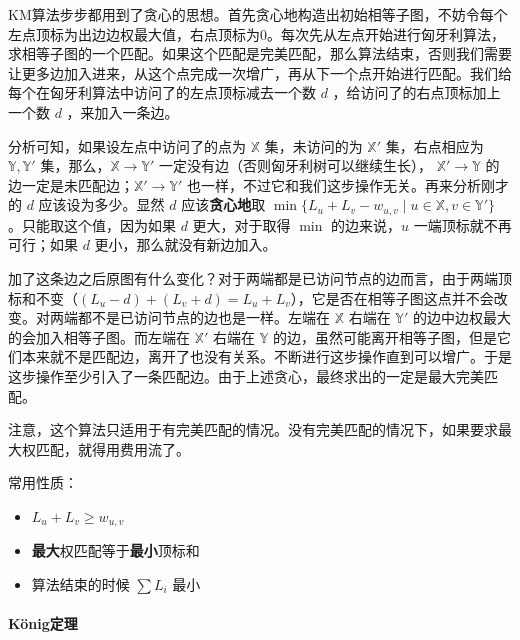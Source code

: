 \documentclass[]{ctexart}
\let\oldparagraph\paragraph
\renewcommand{\paragraph}[1]{\oldparagraph{#1}\mbox{}}
\begin{document}
KM算法步步都用到了贪心的思想。首先贪心地构造出初始相等子图，不妨令每个左点顶标为出边边权最大值，右点顶标为0。每次先从左点开始进行匈牙利算法，求相等子图的一个匹配。如果这个匹配是完美匹配，那么算法结束，否则我们需要让更多边加入进来，从这个点完成一次增广，再从下一个点开始进行匹配。我们给每个在匈牙利算法中访问了的左点顶标减去一个数
\(d\) ，给访问了的右点顶标加上一个数 \(d\) ，来加入一条边。

分析可知，如果设左点中访问了的点为 \(\mathbb{X}\) 集，未访问的为
\(\mathbb{X'}\) 集，右点相应为 \(\mathbb{Y, Y'}\)
集，那么，\(\mathbb{X} \rightarrow \mathbb{Y'}\)
一定没有边（否则匈牙利树可以继续生长），
\(\mathbb{X'} \rightarrow \mathbb{Y}\)
的边一定是未匹配边；\(\mathbb{X'} \rightarrow \mathbb{Y'}\)
也一样，不过它和我们这步操作无关。再来分析刚才的 \(d\)
应该设为多少。显然 \(d\) 应该\textbf{贪心地}取
\( \min\{L_u + L_v - w_{u, v} \mid u \in \mathbb{X}, v \in \mathbb{Y'}\} \)
。只能取这个值，因为如果 \(d\) 更大，对于取得 \(\min\) 的边来说，\(u\)
一端顶标就不再可行；如果 \(d\) 更小，那么就没有新边加入。

加了这条边之后原图有什么变化？对于两端都是已访问节点的边而言，由于两端顶标和不变（\((L_u - d) + (L_v + d) = L_u + L_v\)），它是否在相等子图这点并不会改变。对两端都不是已访问节点的边也是一样。左端在
\(\mathbb{X}\) 右端在 \(\mathbb{Y'}\)
的边中边权最大的会加入相等子图。而左端在 \(\mathbb{X'}\) 右端在
\( \mathbb{Y}\)
的边，虽然可能离开相等子图，但是它们本来就不是匹配边，离开了也没有关系。不断进行这步操作直到可以增广。于是这步操作至少引入了一条匹配边。由于上述贪心，最终求出的一定是最大完美匹配。

注意，这个算法只适用于有完美匹配的情况。没有完美匹配的情况下，如果要求最大权匹配，就得用费用流了。

常用性质：

\begin{itemize}
\item
  \(L_u + L_v \geq w_{u,v}\)
\end{itemize}

\begin{itemize}
\item
  \textbf{最大}权匹配等于\textbf{最小}顶标和
\item
  算法结束的时候 \(\sum L_i\) 最小
\end{itemize}

\hypertarget{header-n409}{%
\paragraph{König定理}\label{header-n409}}
\end{document}
